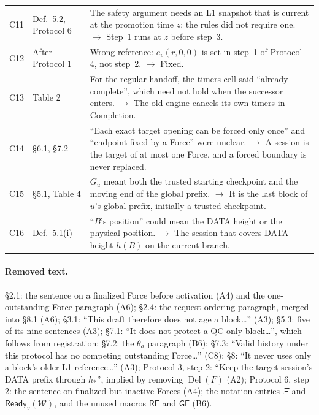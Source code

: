 \documentclass[11pt,a4paper]{article}
\newcommand{\Chg}[1]{\leavevmode\hypertarget{chg:#1}{#1}}
\newcommand{\Del}{\operatorname{Del}}
\newcounter{protocol}
\begin{document}
\begin{xltabular}{\linewidth}{@{}>{\raggedright\arraybackslash}p{.05\linewidth}>{\raggedright\arraybackslash}p{.17\linewidth}Y@{}}
\Chg{C11} & Def.~5.2, Protocol 6 & The safety argument needs an L1 snapshot that is current at the promotion time $z$; the rules did not require one. $\rightarrow$ Step~1 runs at $z$ before step~3.\\
\Chg{C12} & After Protocol 1 & Wrong reference: $e_v(r,0,0)$ is set in step~1 of Protocol 4, not step~2. $\rightarrow$ Fixed.\\
\Chg{C13} & Table 2 & For the regular handoff, the timers cell said ``already complete'', which need not hold when the successor enters. $\rightarrow$ The old engine cancels its own timers in Completion.\\
\Chg{C14} & \S6.1, \S7.2 & ``Each exact target opening can be forced only once'' and ``endpoint fixed by a Force'' were unclear. $\rightarrow$ A session is the target of at most one Force, and a forced boundary is never replaced.\\
\Chg{C15} & \S5.1, Table 4 & $G_u$ meant both the trusted starting checkpoint and the moving end of the global prefix. $\rightarrow$ It is the last block of $u$'s global prefix, initially a trusted checkpoint.\\
\Chg{C16} & Def.~5.1(i) & ``$B$'s position'' could mean the DATA height or the physical position. $\rightarrow$ The session that covers DATA height $h(B)$ on the current branch.\\
\end{xltabular}
\endgroup

\paragraph{Removed text.}
\S2.1: the sentence on a finalized Force before activation (A4) and the
one-outstanding-Force paragraph (A6); \S2.4: the request-ordering
paragraph, merged into \S8.1 (A6); \S3.1: ``This draft therefore does
not age a block\ldots'' (A3); \S5.3: five of its nine sentences (A3);
\S7.1: ``It does not protect a QC-only block\ldots'', which follows from
registration; \S7.2: the $\theta_a$ paragraph (B6); \S7.3: ``Valid
history under this protocol has no competing outstanding Force\ldots''
(C8); \S8: ``It never uses only a block's older L1 reference\ldots''
(A3); Protocol 3, step 2: ``Keep the target session's DATA prefix
through $h_*$'', implied by removing $\Del(F)$ (A2); Protocol 6, step 2:
the sentence on finalized but inactive Forces (A4); the notation entries $\Xi$ and $\mathsf{Ready}_v(\mathcal W)$, and
the unused macros $\mathsf{RF}$ and $\mathsf{GF}$ (B6).
\end{document}
